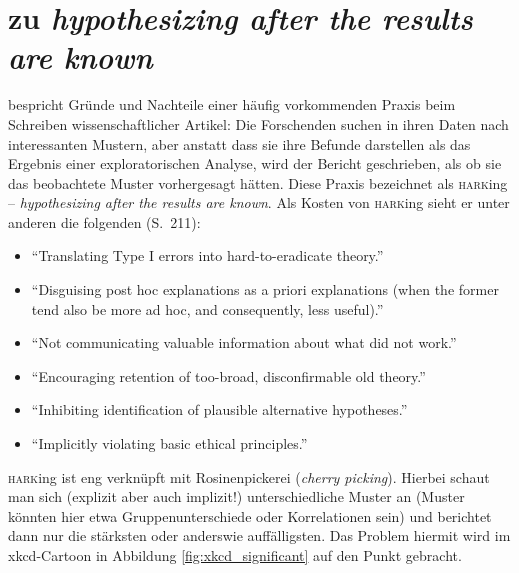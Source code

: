 \documentclass[oneside, 10pt]{book}\usepackage[]{graphicx}\usepackage[]{xcolor}
\begin{document}
\section{\citet{Kerr1998} zu \textit{hypothesizing after the results are known}}
\citet[][20 Seiten Text]{Kerr1998} bespricht Gründe
und Nachteile einer häufig vorkommenden Praxis beim
Schreiben wissenschaftlicher Artikel: Die Forschenden
suchen in ihren Daten nach interessanten Mustern,
aber anstatt dass sie ihre Befunde darstellen als
das Ergebnis einer exploratorischen Analyse, wird 
der Bericht geschrieben, als ob sie das beobachtete
Muster vorhergesagt hätten. Diese Praxis bezeichnet
\citeauthor{Kerr1998} als \textsc{hark}ing -- \textit{hypothesizing
after the results are known}. Als Kosten von \textsc{hark}ing
sieht er unter anderen die folgenden (S.~211):

\begin{itemize}
 \item ``Translating Type I errors into hard-to-eradicate theory.''
 \item ``Disguising post hoc explanations as a priori explanations
 (when the former tend also be more ad hoc, and consequently, less useful).''
 \item ``Not communicating valuable information about what did not work.''
 \item ``Encouraging retention of too-broad, disconfirmable old theory.''
 \item ``Inhibiting identification of plausible alternative hypotheses.''
 \item ``Implicitly violating basic ethical principles.''
\end{itemize}

\textsc{hark}ing ist eng verknüpft mit Rosinenpickerei (\textit{cherry picking}).
Hierbei schaut man sich (explizit aber auch implizit!) unterschiedliche
Muster an (Muster könnten hier etwa Gruppenunterschiede oder Korrelationen sein)
und berichtet dann nur die stärksten oder anderswie auffälligsten. Das Problem
hiermit wird im xkcd-Cartoon in Abbildung \ref{fig:xkcd_significant}
auf den Punkt gebracht.
\end{document}
